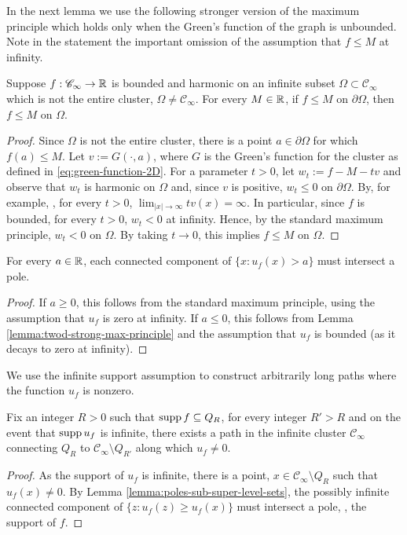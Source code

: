 \documentclass[12pt]{amsart}
\numberwithin{equation}{section}
\begin{document}
	In the next lemma we use the following stronger version of the maximum principle which holds only when the Green's function of the graph is unbounded. 
	Note in the statement the important omission of the assumption that $f \leq M$ at infinity.  
	\begin{lemma} \label{lemma:twod-strong-max-principle}
		Suppose $f: \mathscr{C}_{\infty} \to \operatorname{\mathbb{R}}$ is bounded and harmonic on an infinite subset $\Omega \subset \mathscr{C}_{\infty}$
		which is not the entire cluster, $\Omega \neq \mathscr{C}_{\infty}$. For every $M \in \operatorname{\mathbb{R}}$, if $f \leq M$ on $\partial \Omega$, then $f \leq M$ on $\Omega$.
	\end{lemma}
	\begin{proof}
		Since $\Omega$ is not the entire cluster, there is a point $a \in \partial \Omega$ for which $f(a) \leq M$. 
		Let $v := G(\cdot, a)$, where $G$ is the Green's function for the cluster as defined in \eqref{eq:green-function-2D}. 
		For a parameter $t > 0$, let $w_t :=  f - M - t v$ and observe that $w_t$ is harmonic on $\Omega$ and, since $v$ is positive, 
		$w_t  \leq 0$ on $\partial \Omega$. By, for example, \cite{BH09}, for every $t > 0$, $\lim_{|x| \to \infty} t v(x) = \infty$. 
		In particular, since $f$ is bounded, for every $t > 0$, $w_t < 0$ at infinity. Hence, by the standard maximum principle, $w_t < 0$ on $\Omega$. 
		By taking $t \to 0$, this implies $f \leq M$ on $\Omega$. 
	\end{proof}
	
	
	
	
	\begin{lemma} \label{lemma:poles-sub-super-level-sets}
		For every $a \in \operatorname{\mathbb{R}}$, each connected component of $\{x : u_f(x) > a \}$ must intersect a pole. 
	\end{lemma}
	\begin{proof}
		If $a \geq 0$, this follows from the standard maximum principle, using the assumption that $u_f$ is zero at infinity. If $a \leq 0$, this 
		follows from Lemma \ref{lemma:twod-strong-max-principle} and the assumption that $u_f$ is bounded (as it decays to zero at infinity).  \end{proof}
	
	
	
	
	We use the infinite support assumption to construct arbitrarily long paths where the function $u_f$ is nonzero. 
	\begin{lemma} \label{lemma:long-nonzero-paths}
		Fix an integer $R > 0$ such that $\mathrm{supp\,} f \subseteq Q_R$, for every integer $R' > R$ and on the event that $\mathrm{supp\,} u_f$ is infinite, there exists a path in the infinite cluster $\mathscr{C}_\infty$ connecting $Q_R$ to $\mathscr{C}_\infty \setminus Q_{R'}$ along which $u_f \neq 0$. 
	\end{lemma}
	\begin{proof}
		As the support of $u_f$ is infinite, there is a point, $x \in \mathscr{C}_{\infty} \setminus Q_{R}$ such that $u_f(x) \neq 0$. 
		By Lemma \ref{lemma:poles-sub-super-level-sets}, the possibly infinite connected component of $\{ z : u_f(z) \geq u_f(x) \}$ must intersect a pole, \ie, the support of $f$. \end{proof}
	
\end{document}

